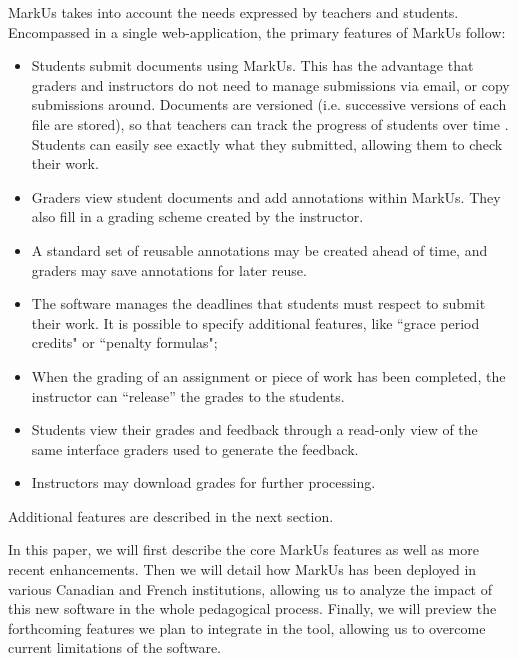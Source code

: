 \documentclass[twocolumn,10pt]{asme2e}
\begin{document}
MarkUs takes into account the needs expressed by teachers and students. Encompassed in a single web-application, the primary features of MarkUs follow:
\begin{itemize}
\item Students submit documents using MarkUs. This has the advantage that graders and instructors do not need to manage submissions via email, or copy submissions around. Documents are versioned (i.e. successive versions of each file are stored), so that teachers can track the progress of students over time \cite{Reid05learningby}. Students can easily see exactly what they submitted, allowing them to check their work.
\item Graders view student documents and add annotations within MarkUs. They also fill in a grading scheme created by the instructor. 
\item A standard set of reusable annotations may be created ahead of time, and graders may save annotations for later reuse.
\item The software manages the deadlines that students must respect to submit their work. It is possible to specify additional features, like ``grace period credits" or ``penalty formulas";
\item When the grading of an assignment or piece of work has been completed, the instructor can ``release'' the grades to the students.
\item Students view their grades and feedback through a read-only view of the same interface graders used to generate the feedback.
\item Instructors may download grades for further processing.
\end{itemize}

Additional features are described in the next section.


In this paper, we will first describe the core MarkUs features as well as more recent enhancements. Then we will detail how MarkUs has been deployed in various Canadian and French institutions, allowing us to analyze the impact of this new software in the whole pedagogical process. Finally, we will preview the forthcoming features we plan to integrate in the tool, allowing us to overcome current limitations of the software. 
\end{document}
